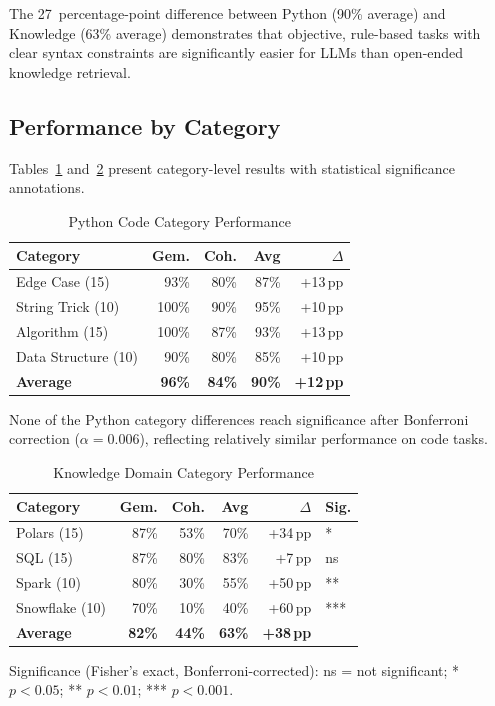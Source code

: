 \documentclass[conference]{IEEEtran}
\begin{document}
The 27~percentage-point difference between Python (90\% average) and Knowledge (63\% average) demonstrates that objective, rule-based tasks with clear syntax constraints are significantly easier for LLMs than open-ended knowledge retrieval.

\subsection{Performance by Category}

Tables~\ref{tab:python} and~\ref{tab:knowledge} present category-level results with statistical significance annotations.

\begin{table}[!t]
\caption{Python Code Category Performance}
\label{tab:python}
\centering
\begin{tabular}{l r r r r}
\toprule
\textbf{Category} & \textbf{Gem.} & \textbf{Coh.} & \textbf{Avg} & \textbf{$\Delta$} \\
\midrule
Edge Case (15)      & 93\% & 80\% & 87\% & +13\,pp \\
String Trick (10)   & 100\% & 90\% & 95\% & +10\,pp \\
Algorithm (15)      & 100\% & 87\% & 93\% & +13\,pp \\
Data Structure (10) & 90\% & 80\% & 85\% & +10\,pp \\
\midrule
\textbf{Average}    & \textbf{96\%} & \textbf{84\%} & \textbf{90\%} & \textbf{+12\,pp} \\
\bottomrule
\end{tabular}
\vspace{2pt}
\footnotesize None of the Python category differences reach significance after Bonferroni correction ($\alpha=0.006$), reflecting relatively similar performance on code tasks.
\end{table}

\begin{table}[!t]
\caption{Knowledge Domain Category Performance}
\label{tab:knowledge}
\centering
\begin{tabular}{l r r r r l}
\toprule
\textbf{Category} & \textbf{Gem.} & \textbf{Coh.} & \textbf{Avg} & \textbf{$\Delta$} & \textbf{Sig.} \\
\midrule
Polars (15)     & 87\% & 53\% & 70\% & +34\,pp & * \\
SQL (15)        & 87\% & 80\% & 83\% & +7\,pp  & ns \\
Spark (10)      & 80\% & 30\% & 55\% & +50\,pp & ** \\
Snowflake (10)  & 70\% & 10\% & 40\% & +60\,pp & *** \\
\midrule
\textbf{Average} & \textbf{82\%} & \textbf{44\%} & \textbf{63\%} & \textbf{+38\,pp} & \\
\bottomrule
\end{tabular}
\vspace{2pt}
\footnotesize Significance (Fisher's exact, Bonferroni-corrected): ns = not significant; * $p<0.05$; ** $p<0.01$; *** $p<0.001$.
\end{table}
\end{document}
